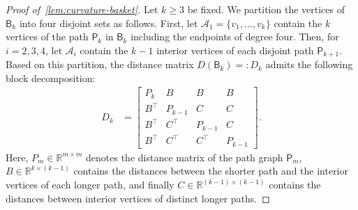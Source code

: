 \documentclass[11pt,a4paper]{article}
\newcommand{\distmatrix}{D}
\newcommand{\Path}{\mathsf{P}}
\newcommand{\Basket}{\mathsf{B}}
\begin{document}
    \begin{proof}[Proof of~\cref{lem:curvature-basket}]
        Let $k\geq 3$ be fixed. We partition the vertices of $\Basket_k$ into four disjoint sets as follows. First, let $\mathcal{A}_1 = \{v_1, \dotsc, v_k\}$ contain the $k$ vertices of the path $\Path_k$ in $\Basket_k$ including the endpoints of degree four. Then, for $i=2, 3, 4$, let $\mathcal{A}_i$ contain the $k-1$ interior vertices of each disjoint path $\Path_{k+1}$.  Based on this partition, the distance matrix $\distmatrix(\Basket_k)=:\distmatrix_k$ admits the following block decomposition:
            \begin{align*}
                \distmatrix_k &= \begin{bmatrix}
                    {P}_{k} & {B} & {B} & {B}\\
                    {B}^\top & {P}_{k-1} & {C} & {C}\\
                    {B}^\top & {C}^\top & {P}_{k-1} & {C}\\
                    {B}^\top & {C}^\top & {C}^\top & {P}_{k-1}
                \end{bmatrix}.
            \end{align*}
        Here, ${P}_m\in\mathbb{R}^{m\times m}$ denotes the distance matrix of the path graph $\Path_m$, ${B}\in\mathbb{R}^{k\times (k-1)}$ contains the distances between the shorter path and the interior vertices of each longer path, and finally ${C}\in\mathbb{R}^{(k-1)\times (k-1)}$ contains the distances between interior vertices of distinct longer paths.


\end{proof}
\end{document}
